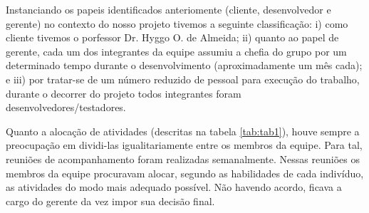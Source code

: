 
Instanciando os papeis identificados anteriomente (cliente, desenvolvedor e gerente) no contexto do nosso projeto tivemos a seguinte classificação: i) como cliente tivemos o porfessor Dr. Hyggo O. de Almeida; ii) quanto ao papel de gerente, cada um dos integrantes da equipe assumiu a chefia do grupo por um determinado tempo durante o desenvolvimento (aproximadamente um mês cada); e iii) por tratar-se de um número reduzido de pessoal para execução do trabalho, durante o decorrer do projeto todos integrantes foram desenvolvedores/testadores.

Quanto a alocação de atividades (descritas na tabela \ref{tab:tab1}), houve sempre a preocupação em dividi-las igualitariamente entre os membros da equipe. Para tal, reuniões de acompanhamento foram realizadas semanalmente. Nessas reuniões os membros da equipe procuravam alocar, segundo as habilidades de cada indivíduo, as atividades do modo mais adequado possível. Não havendo acordo, ficava a cargo do gerente da vez impor sua decisão final.

